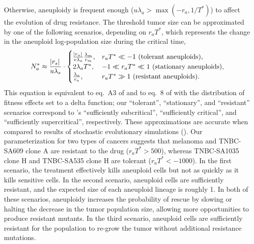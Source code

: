 \documentclass[12pt]{extarticle}
\renewcommand{\Delta}{r}
\begin{document}
Otherwise, aneuploidy is frequent enough ($u\lambda_a > \max{\left(-\Delta_a, 1/T^*\right)}$) to affect the evolution of drug resistance. 
The threshold tumor size can be approximated by one of the following scenarios, depending on $\Delta_a T^*$, which represents the change in the aneuploid log-population size during the critical time,
\begin{equation}  \label{eq:N_a}
\begin{aligned}
N_a^* \approx 
  \frac{\abs{\Delta_s}}{u\lambda_s} \cdot \begin{cases}
    \frac{\abs{\Delta_a}}{v\lambda_a}  \frac{\lambda_m}{\Delta_m} ,&
  \Delta_a T^* \ll -1 \text{ (tolerant aneuploids)},\\ 
  2\lambda_a T^* ,&
  -1 \ll \Delta_a T^* \ll 1  \text{ (stationary aneuploids)},\\ 
  \frac{\lambda_a}{\Delta_a} ,&
   \Delta_a T^* \gg 1 \text{ (resistant aneuploids)}.
  \end{cases}
\end{aligned}
\end{equation}
This equation is equivalent to eq.~A3 of \citet{iwasa2004evolutionary} and to eq.~8 of \citet{osmond_genetic_2020} with the distribution of fitness effects set to a delta function;
our ``tolerant'', ``stationary'', and ``resistant'' scenarios correspond to \citet{osmond_genetic_2020}'s ``sufficiently subcritical'', ``sufficiently critical'', and ``sufficiently supercritical'', respectively. %
These approximations are accurate when compared to results of stochastic evolutionary simulations (). 
Our parameterization for two types of cancers suggests that melanoma and TNBC-SA609 clone A are resistant to the drug ($\Delta_a T^*>500$), whereas TNBC-SA1035 clone H and TNBC-SA535 clone H are tolerant ($\Delta_a T^*<-1000$). 
In the first scenario, the treatment effectively kills aneuploid cells but not as quickly as it kills sensitive cells. 
In the second scenario, aneuploid cells are sufficiently resistant, and the expected size of each aneuploid lineage is roughly 1.
In both of these scenarios, aneuploidy increases the probability of rescue by slowing or halting the decrease in the tumor population size, allowing more opportunities to produce resistant mutants. 
In the third scenario, aneuploid cells are sufficiently resistant for the population to re-grow the tumor without additional resistance mutations.
\end{document}
